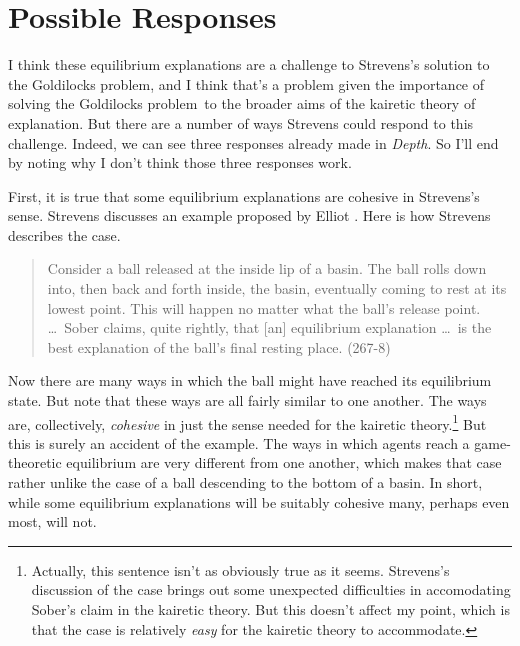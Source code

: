 \section{Possible Responses}

I think these equilibrium explanations are a challenge to Strevens's solution to the Goldilocks problem, and I think that's a problem given the importance of solving the Goldilocks problem\ to the broader aims of the kairetic theory of explanation. But there are a number of ways Strevens could respond to this challenge. Indeed, we can see three responses already made in \textit{Depth}. So I'll end by noting why I don't think those three responses work.

First, it is true that some equilibrium explanations are cohesive in Strevens's sense. Strevens discusses an example proposed by Elliot \citet{Sober1983}. %
Here is how Strevens describes the case.

\begin{quote}
Consider a ball released at the inside lip of a basin. The ball rolls down into, then back and forth inside, the basin, eventually coming to rest at its lowest point. This will happen no matter what the ball's release point. \ldots\ Sober claims, quite rightly, that [an] equilibrium explanation \ldots\ is the best explanation of the ball's final resting place. (267-8)
\end{quote} 

\noindent Now there are many ways in which the ball might have reached its equilibrium state. But note that these ways are all fairly similar to one another. The ways are, collectively, \textit{cohesive} in just the sense needed for the kairetic theory.\footnote{Actually, this sentence isn't as obviously true as it seems. Strevens's discussion of the case brings out some unexpected difficulties in accomodating Sober's claim in the kairetic theory. But this doesn't affect my point, which is that the case is relatively \textit{easy} for the kairetic theory to accommodate.} But this is surely an accident of the example. The ways in which agents reach a game-theoretic equilibrium are very different from one another, which makes that case rather unlike the case of a ball descending to the bottom of a basin. In short, while some equilibrium explanations will be suitably cohesive many, perhaps even most, will not.

